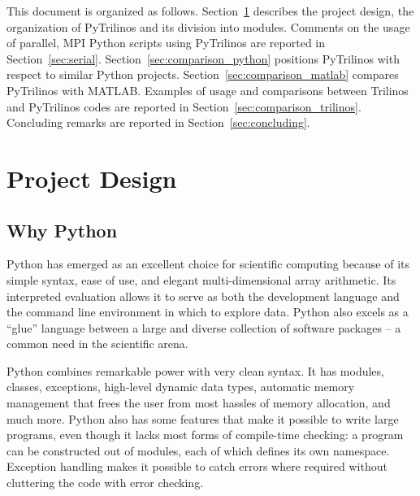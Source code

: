 \documentclass[10pt,relax]{SANDreport}
\begin{document}
\smallskip

This document is organized as follows. Section~\ref{sec:design} describes the
project design, the organization of PyTrilinos and its division into modules.
Comments on the usage of
parallel, MPI Python scripts using PyTrilinos are reported in
Section~\ref{sec:serial}. 
Section~\ref{sec:comparison_python} positions PyTrilinos with respect to similar Python projects. 
Section~\ref{sec:comparison_matlab} compares PyTrilinos with MATLAB.
Examples of usage and comparisons between Trilinos
and PyTrilinos codes are reported in Section~\ref{sec:comparison_trilinos}.
Concluding remarks are reported in Section~\ref{sec:concluding}.

\section{Project Design}
\label{sec:design}

\subsection{Why Python}
\label{sec:why}

Python has emerged as an excellent choice for scientific computing
because of its simple syntax, ease of use, and elegant
multi-dimensional array arithmetic. Its interpreted evaluation allows
it to serve as both the development language and the command line
environment in which to explore data. Python also excels as a ``glue''
language between a large and diverse collection of software packages
-- a common need in the scientific arena.

Python combines remarkable power with very clean syntax. It has
modules, classes, exceptions, high-level dynamic data types, automatic
memory management that frees the user from most hassles of memory
allocation, and much more. Python also has some features that make it
possible to write large programs, even though it lacks most forms of
compile-time checking: a program can be constructed out of modules,
each of which defines its own namespace. Exception handling makes it
possible to catch errors where required without cluttering the code
with error checking.
\end{document}
